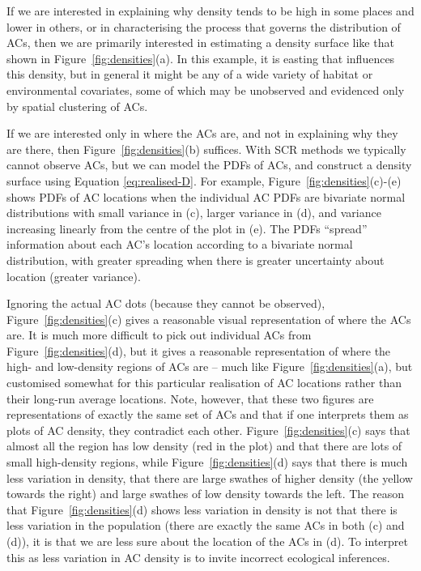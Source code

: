 \documentclass[useAMS,usenatbib,referee]{biom}
\begin{document}
If we are interested in explaining why density tends to be high in some places and lower in others, or in characterising the process that governs the distribution of ACs, then we are primarily interested in estimating a density surface like that shown in Figure~\ref{fig:densities}(a). In this example, it is easting that influences this density, but in general it might be any of a wide variety of habitat or environmental covariates, some of which may be unobserved and evidenced only by spatial clustering of ACs. 

If we are interested only in where the ACs are, and not in explaining why they are there, then Figure~\ref{fig:densities}(b) suffices. With SCR methods we typically cannot observe ACs, but we can model the PDFs of ACs, and construct a density surface using Equation \eqref{eq:realised-D}. For example, Figure~\ref{fig:densities}(c)-(e) shows PDFs of AC locations when the individual AC PDFs are bivariate normal distributions with small variance in (c), larger variance in (d), and variance increasing linearly from the centre of the plot in (e). The PDFs ``spread'' information about each AC's location according to a bivariate normal distribution, with greater spreading when there is greater uncertainty about location (greater variance).

Ignoring the actual AC dots (because they cannot be observed), Figure~\ref{fig:densities}(c) gives a reasonable visual representation of where the ACs are. It is much more difficult to pick out individual ACs from Figure~\ref{fig:densities}(d), but it gives a reasonable representation of where the high- and low-density regions of ACs are -- much like Figure~\ref{fig:densities}(a), but customised somewhat for this particular realisation of AC locations rather than their long-run average locations. Note, however, that these two figures are representations of exactly the same set of ACs and that if one interprets them as plots of AC density, they contradict each other. Figure~\ref{fig:densities}(c) says that almost all the region has low density (red in the plot) and that there are lots of small high-density regions, while Figure~\ref{fig:densities}(d) says that there is much less variation in density, that there are large swathes of higher density (the yellow towards the right) and large swathes of low density towards the left. The reason that Figure~\ref{fig:densities}(d) shows less variation in density is not that there is less variation in the population (there are exactly the same ACs in both (c) and (d)), it is that we are less sure about the location of the ACs in (d). To interpret this as less variation in AC density is to invite incorrect ecological inferences.
\end{document}
